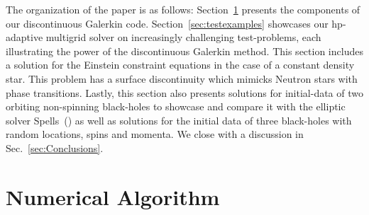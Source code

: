 The organization of the paper is as follows: 
Section~\ref{sec:numericalalgorithm} presents the components of our
  discontinuous Galerkin code. Section~\ref{sec:testexamples} 
  showcases our hp-adaptive multigrid solver on  increasingly challenging test-problems, each
  illustrating the power of the discontinuous Galerkin method. This section includes a solution for the Einstein constraint equations in the case of a constant density star. This problem has a surface discontinuity which mimicks Neutron stars with phase transitions. Lastly, this section also presents solutions for
  initial-data of two orbiting non-spinning black-holes to
  showcase and compare it with the elliptic solver Spells~(\cite{pfeiffer2003})
 as well as solutions for the initial data
  of three black-holes with random locations, spins and momenta.  We
  close with a discussion in Sec.~\ref{sec:Conclusions}.


\section{Numerical Algorithm}
\label{sec:numericalalgorithm}



